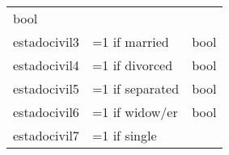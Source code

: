 \documentclass[11pt]{article}
\begin{document}
\begin{longtable}[]{@{}lll@{}}
\begin{minipage}[t]{0.24\columnwidth}
bool\strut
\end{minipage}\tabularnewline
\begin{minipage}[t]{0.19\columnwidth}\raggedright\strut
estadocivil3\strut
\end{minipage} & \begin{minipage}[t]{0.16\columnwidth}\raggedright\strut
=1 if married\strut
\end{minipage} & \begin{minipage}[t]{0.24\columnwidth}\raggedright\strut
bool\strut
\end{minipage}\tabularnewline
\begin{minipage}[t]{0.19\columnwidth}\raggedright\strut
estadocivil4\strut
\end{minipage} & \begin{minipage}[t]{0.16\columnwidth}\raggedright\strut
=1 if divorced\strut
\end{minipage} & \begin{minipage}[t]{0.24\columnwidth}\raggedright\strut
bool\strut
\end{minipage}\tabularnewline
\begin{minipage}[t]{0.19\columnwidth}\raggedright\strut
estadocivil5\strut
\end{minipage} & \begin{minipage}[t]{0.16\columnwidth}\raggedright\strut
=1 if separated\strut
\end{minipage} & \begin{minipage}[t]{0.24\columnwidth}\raggedright\strut
bool\strut
\end{minipage}\tabularnewline
\begin{minipage}[t]{0.19\columnwidth}\raggedright\strut
estadocivil6\strut
\end{minipage} & \begin{minipage}[t]{0.16\columnwidth}\raggedright\strut
=1 if widow/er\strut
\end{minipage} & \begin{minipage}[t]{0.24\columnwidth}\raggedright\strut
bool\strut
\end{minipage}\tabularnewline
\begin{minipage}[t]{0.19\columnwidth}\raggedright\strut
estadocivil7\strut
\end{minipage} & \begin{minipage}[t]{0.16\columnwidth}\raggedright\strut
=1 if single\strut
\end{minipage} & \begin{minipage}[t]{0.24\columnwidth}\raggedright\strut

\end{minipage}
\end{longtable}
\end{document}
